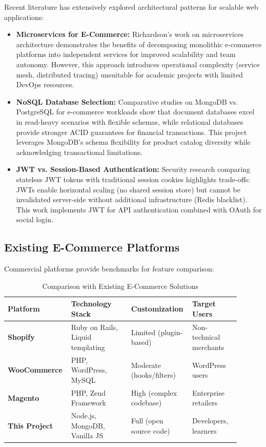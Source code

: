 \documentclass[12pt, a4paper]{report}
\begin{document}
Recent literature has extensively explored architectural patterns for scalable web applications:

\begin{itemize}
    \item \textbf{Microservices for E-Commerce:} Richardson's work on microservices architecture demonstrates the benefits of decomposing monolithic e-commerce platforms into independent services for improved scalability and team autonomy. However, this approach introduces operational complexity (service mesh, distributed tracing) unsuitable for academic projects with limited DevOps resources.
    
    \item \textbf{NoSQL Database Selection:} Comparative studies on MongoDB vs. PostgreSQL for e-commerce workloads show that document databases excel in read-heavy scenarios with flexible schemas, while relational databases provide stronger ACID guarantees for financial transactions. This project leverages MongoDB's schema flexibility for product catalog diversity while acknowledging transactional limitations.
    
    \item \textbf{JWT vs. Session-Based Authentication:} Security research comparing stateless JWT tokens with traditional session cookies highlights trade-offs: JWTs enable horizontal scaling (no shared session store) but cannot be invalidated server-side without additional infrastructure (Redis blacklist). This work implements JWT for API authentication combined with OAuth for social login.
\end{itemize}

\subsection{Existing E-Commerce Platforms}

Commercial platforms provide benchmarks for feature comparison:

\begin{table}[H]
\centering
\caption{Comparison with Existing E-Commerce Solutions}
\label{tab:related_work_comparison}
\small
\begin{tabular}{@{}p{0.20\linewidth}p{0.25\linewidth}p{0.25\linewidth}p{0.20\linewidth}@{}}
\toprule
\textbf{Platform} & \textbf{Technology Stack} & \textbf{Customization} & \textbf{Target Users} \\
\midrule
\textbf{Shopify} & Ruby on Rails, Liquid templating & Limited (plugin-based) & Non-technical merchants \\
\textbf{WooCommerce} & PHP, WordPress, MySQL & Moderate (hooks/filters) & WordPress users \\
\textbf{Magento} & PHP, Zend Framework & High (complex codebase) & Enterprise retailers \\
\textbf{This Project} & Node.js, MongoDB, Vanilla JS & Full (open source code) & Developers, learners \\
\bottomrule
\end{tabular}
\end{table}
\end{document}
